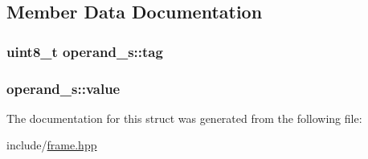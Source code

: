 \subsection{Member Data Documentation}
\hypertarget{structoperand__s_a3096a61fdc761a5231b863b2945165bb}{
\subsubsection[{tag}]{\setlength{\rightskip}{0pt plus 5cm}uint8\+\_\+t operand\+\_\+s\+::tag}}\label{structoperand__s_a3096a61fdc761a5231b863b2945165bb}
\hypertarget{structoperand__s_ae5e9c83467419221b9bc57dd8dff5ad6}{
\subsubsection[{value}]{ operand\+\_\+s\+::value}}\label{structoperand__s_ae5e9c83467419221b9bc57dd8dff5ad6}


The documentation for this struct was generated from the following file\+:\begin{DoxyCompactItemize}
\item 
include/\hyperlink{frame_8hpp}{frame.\+hpp}\end{DoxyCompactItemize}
